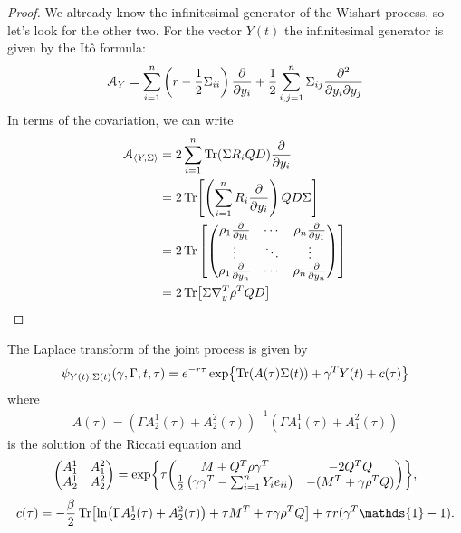 \begin{proof}
    We altready know the infinitesimal generator of the Wishart process, so let's look for the other two. For the vector $Y(t)$ the infinitesimal generator is given by the Itô formula:
    \begin{align*}
        \mathcal{A}_Y = \sum_{i=1}^n\left(r-\frac{1}{2}\Sigma_{ii}\right)\pdv{}{y_i}+\frac{1}{2}\sum_{i,j=1}^n\Sigma_{ij}\pdv{}{y_i}{y_j}
    \end{align*}
    In terms of the covariation, we can write
    \begin{align*}
        \mathcal{A}_{\expval{Y,\Sigma}} &= 2\sum_{i=1}^n\Tr(\Sigma R_iQD)\pdv{}{y_i} \\
        &=
        2\Tr[\left(\sum_{i=1}^nR_i\pdv{}{y_i}\right)QD\Sigma] \\
        &=
        2
        \Tr\left[\mqty(\rho_1\pdv{}{y_1} & \cdots & \rho_n\pdv{}{y_1} \\
                       \vdots            & \ddots & \vdots \\
                       \rho_1\pdv{}{y_n} & \cdots & \rho_n\pdv{}{y_n})\right] \\
        &=
        2\Tr[\Sigma\nabla_y^T\rho^TQD]
    \end{align*}
\end{proof}
\begin{proposition}
    The Laplace transform of the joint process is given by
    \begin{align}
        \psi_{Y(t),\Sigma(t)}(\gamma,\Gamma,t,\tau) = e^{-r\tau} \exp{\Tr(A(\tau)\Sigma(t))+\gamma^TY(t)+c(\tau)}
    \end{align}
    where
    \begin{align}
        A(\tau) = (\Gamma A^1_2(\tau)+A_2^2(\tau))^{-1}(\Gamma A^1_1(\tau)+A_1^2(\tau))
    \end{align}
    is the solution of the Riccati equation and
    \begin{align}
        \mqty(A_1^1 & A_1^2 \\ A_2^1 & A_2^2) = \exp{\tau\mqty(M+Q^T\rho\gamma^T & -2Q^TQ \\ \tfrac{1}{2}\left(\gamma\gamma^T-\sum_{i=1}^nY_ie_{ii}\right) & -(M^T+\gamma\rho^TQ))},
    \end{align}
    \begin{align}
        c(\tau) = -\frac{\beta}{2}\Tr[\ln(\Gamma A_2^1(\tau)+A_2^2(\tau)) + \tau M^T + \tau\gamma\rho^TQ] + \tau r (\gamma^T\mathds{1}-1).
    \end{align}
\end{proposition}
